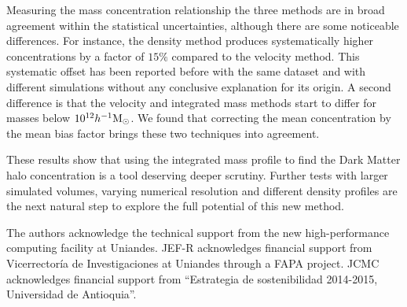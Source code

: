 \documentclass{emulateapj}
\newcommand{\hMsun}{{\ifmmode{h^{-1}{\rm {M_{\odot}}}}\else{$h^{-1}{\rm{M_{\odot}}}$}\fi}}
\begin{document}
Measuring the mass concentration relationship the three methods are in
broad agreement within the statistical  uncertainties, although there
are some noticeable differences. 
For instance, the density method produces systematically higher
concentrations by a factor of $15\%$ compared to the velocity method.
This systematic offset has been reported before with the same dataset 
\citep{Prada2012} and with different simulations \citep{Klypin2016}
without any conclusive explanation for its origin. 
A second difference is that the velocity and integrated mass methods
start to differ for masses below $10^{12}\hMsun$.  
We found that correcting the mean concentration by the mean bias
factor brings these two techniques into agreement.

These results show that using the integrated mass profile to find the
Dark Matter halo concentration is a tool deserving deeper scrutiny.   
Further tests with larger simulated volumes, varying numerical
resolution and different density profiles are the next natural step to
explore the full potential of this new method. 


\vspace{0.1cm}

 The authors acknowledge the technical support from the new
 high-performance computing facility at Uniandes. JEF-R acknowledges
 financial support from Vicerrector\'ia de Investigaciones at Uniandes
 through a FAPA project. JCMC acknowledges financial support from
 ``Estrategia de  sostenibilidad 2014-2015, Universidad de
 Antioquia''.    
\end{document}
